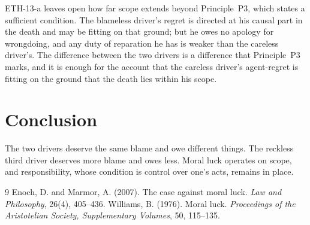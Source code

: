 \documentclass{situationist-preprint}
\begin{document}
\begin{reply}
ETH-13-a leaves open how far scope extends beyond Principle~P3, which states a sufficient condition. The blameless driver's regret is directed at his causal part in the death and may be fitting on that ground; but he owes no apology for wrongdoing, and any duty of reparation he has is weaker than the careless driver's. The difference between the two drivers is a difference that Principle~P3 marks, and it is enough for the account that the careless driver's agent-regret is fitting on the ground that the death lies within his scope.
\end{reply}

\section{Conclusion}

The two drivers deserve the same blame and owe different things. The reckless third driver deserves more blame and owes less. Moral luck operates on scope, and responsibility, whose condition is control over one's acts, remains in place.

\begin{thebibliography}{9}\small
{} Enoch, D. and Marmor, A. (2007). The case against moral luck. \emph{Law and Philosophy}, 26(4), 405--436.
 Williams, B. (1976). Moral luck. \emph{Proceedings of the Aristotelian Society, Supplementary Volumes}, 50, 115--135.
\end{thebibliography}
\end{document}
